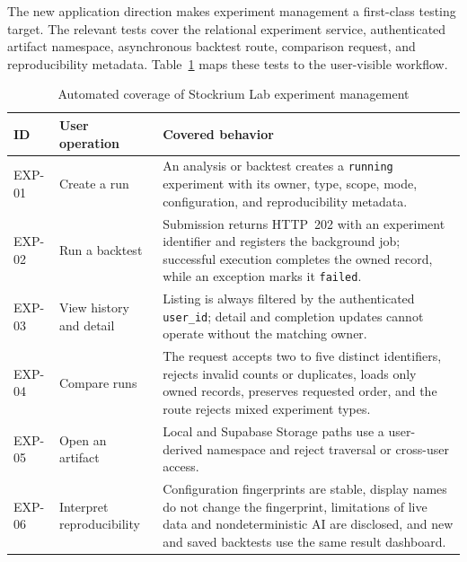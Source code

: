 The new application direction makes experiment management a first-class testing target. The relevant tests cover the relational experiment service, authenticated artifact namespace, asynchronous backtest route, comparison request, and reproducibility metadata. Table~\ref{tab:experiment-workflow-coverage} maps these tests to the user-visible workflow.

\begin{table}[H]
    \centering
    \caption{Automated coverage of Stockrium Lab experiment management}
    \label{tab:experiment-workflow-coverage}
    \footnotesize
    \begin{tabularx}{\textwidth}{>{\raggedright\arraybackslash}p{1.35cm} >{\raggedright\arraybackslash}p{3.0cm} X}
        \toprule
        \textbf{ID} & \textbf{User operation} & \textbf{Covered behavior} \\
        \midrule
        EXP-01 & Create a run & An analysis or backtest creates a \texttt{running} experiment with its owner, type, scope, mode, configuration, and reproducibility metadata. \\
        \addlinespace
        EXP-02 & Run a backtest & Submission returns HTTP~202 with an experiment identifier and registers the background job; successful execution completes the owned record, while an exception marks it \texttt{failed}. \\
        \addlinespace
        EXP-03 & View history and detail & Listing is always filtered by the authenticated \texttt{user\_id}; detail and completion updates cannot operate without the matching owner. \\
        \addlinespace
        EXP-04 & Compare runs & The request accepts two to five distinct identifiers, rejects invalid counts or duplicates, loads only owned records, preserves requested order, and the route rejects mixed experiment types. \\
        \addlinespace
        EXP-05 & Open an artifact & Local and Supabase Storage paths use a user-derived namespace and reject traversal or cross-user access. \\
        \addlinespace
        EXP-06 & Interpret reproducibility & Configuration fingerprints are stable, display names do not change the fingerprint, limitations of live data and nondeterministic AI are disclosed, and new and saved backtests use the same result dashboard. \\
        \bottomrule
    \end{tabularx}
\end{table}

